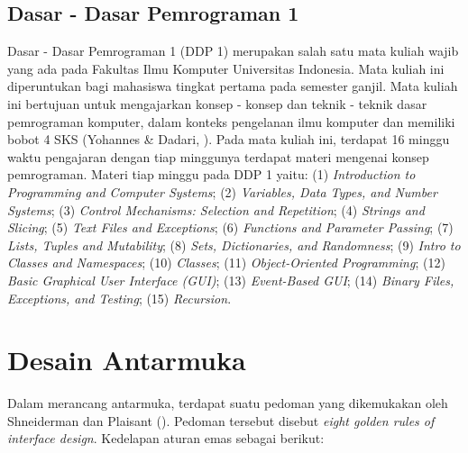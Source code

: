 	\subsection{Dasar - Dasar Pemrograman 1}
	Dasar - Dasar Pemrograman 1 (DDP 1) merupakan salah satu mata kuliah wajib yang ada pada Fakultas Ilmu Komputer Universitas Indonesia. Mata kuliah ini diperuntukan bagi mahasiswa tingkat pertama pada semester ganjil. Mata kuliah ini bertujuan untuk mengajarkan konsep - konsep dan teknik - teknik dasar pemrograman komputer, dalam konteks pengelanan ilmu komputer dan memiliki bobot 4 SKS (Yohannes \& Dadari, \citeyear{brp.ddp1}).
	\linebreak\linebreak
	Pada mata kuliah ini, terdapat 16 minggu waktu pengajaran dengan tiap minggunya terdapat materi mengenai konsep pemrograman. Materi tiap minggu pada DDP 1 yaitu: (1) \textit{Introduction to Programming and Computer Systems}; (2) \textit{Variables, Data Types, and Number Systems}; (3) \textit{Control Mechanisms: Selection and Repetition}; (4) \textit{Strings and Slicing}; (5) \textit{Text Files and Exceptions}; (6) \textit{Functions and Parameter Passing}; (7) \textit{Lists, Tuples and Mutability}; (8) \textit{Sets, Dictionaries, and Randomness}; (9) \textit{Intro to Classes and Namespaces}; (10) \textit{Classes}; (11) \textit{Object-Oriented Programming}; (12) \textit{Basic Graphical User Interface (GUI)}; (13) \textit{Event-Based GUI}; (14) \textit{Binary Files, Exceptions, and Testing}; (15) \textit{Recursion}.
	
\section{Desain Antarmuka}
Dalam merancang antarmuka, terdapat suatu pedoman yang dikemukakan oleh Shneiderman dan Plaisant (\citeyear{papper.shneiderman}).
Pedoman tersebut disebut \textit{eight golden rules of interface design}. Kedelapan aturan emas sebagai berikut:

